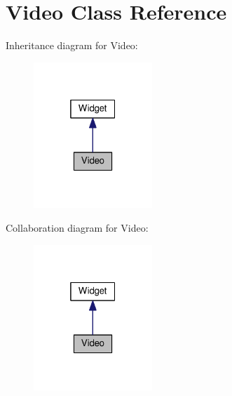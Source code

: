 \hypertarget{class_video}{}\section{Video Class Reference}
\label{class_video}


Inheritance diagram for Video\+:\nopagebreak
\begin{figure}[H]
\begin{center}
\leavevmode
\includegraphics[width=127pt]{class_video__inherit__graph}
\end{center}
\end{figure}


Collaboration diagram for Video\+:\nopagebreak
\begin{figure}[H]
\begin{center}
\leavevmode
\includegraphics[width=127pt]{class_video__coll__graph}
\end{center}
\end{figure}
